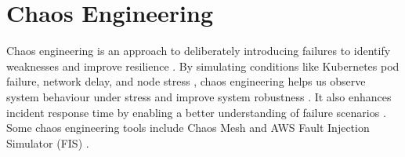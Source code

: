 \section{Chaos Engineering}
Chaos engineering is an approach to deliberately introducing failures to identify weaknesses and improve resilience \cite{chaos_engineering_definition}. By simulating conditions like Kubernetes pod failure, network delay, and node stress \cite{chaos_mesh_feature}, chaos engineering helps us observe system behaviour under stress and improve system robustness \cite{chaos_engineering_definition}. It also enhances incident response time by enabling a better understanding of failure scenarios \cite{chaos_engineering_definition}. Some chaos engineering tools include Chaos Mesh \cite{chaos_mesh_introduction} and AWS Fault Injection Simulator (FIS) \cite{fis_introduction}.

